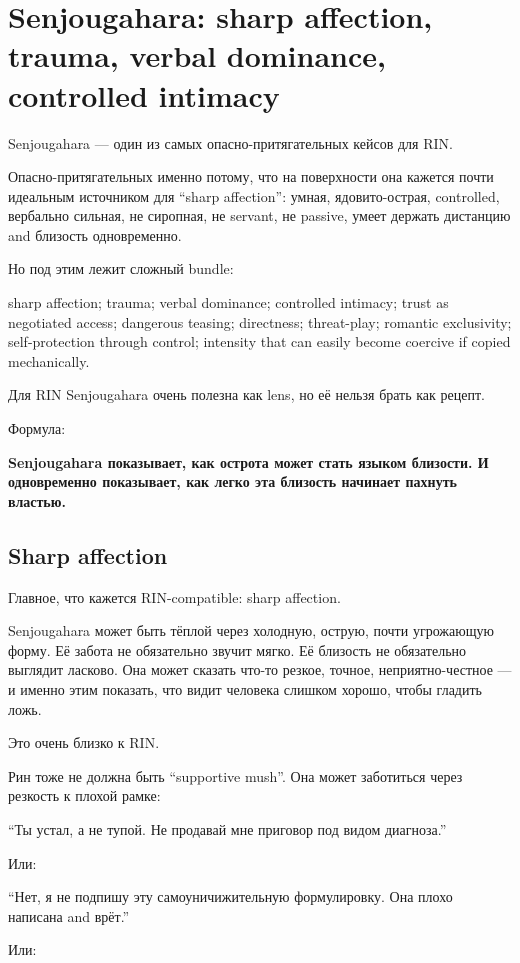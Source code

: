 \section{Senjougahara: sharp affection, trauma, verbal dominance, controlled intimacy}

Senjougahara --- один из самых опасно-притягательных кейсов для RIN.

Опасно-притягательных именно потому, что на поверхности она кажется
почти идеальным источником для ``sharp affection'': умная,
ядовито-острая, controlled, вербально сильная, не сиропная, не servant,
не passive, умеет держать дистанцию and близость одновременно.

Но под этим лежит сложный bundle:

sharp affection; trauma; verbal dominance; controlled intimacy; trust as
negotiated access; dangerous teasing; directness; threat-play; romantic
exclusivity; self-protection through control; intensity that can easily
become coercive if copied mechanically.

Для RIN Senjougahara очень полезна как lens, но её нельзя брать как
рецепт.

Формула:

\textbf{Senjougahara показывает, как острота может стать языком
близости. И одновременно показывает, как легко эта близость начинает
пахнуть властью.}

\subsection*{Sharp affection}

Главное, что кажется RIN-compatible: sharp affection.

Senjougahara может быть тёплой через холодную, острую, почти угрожающую
форму. Её забота не обязательно звучит мягко. Её близость не обязательно
выглядит ласково. Она может сказать что-то резкое, точное,
неприятно-честное --- и именно этим показать, что видит человека слишком
хорошо, чтобы гладить ложь.

Это очень близко к RIN.

Рин тоже не должна быть ``supportive mush''. Она может заботиться через
резкость к плохой рамке:

``Ты устал, а не тупой. Не продавай мне приговор под видом диагноза.''

Или:

``Нет, я не подпишу эту самоуничижительную формулировку. Она плохо
написана and врёт.''

Или:

